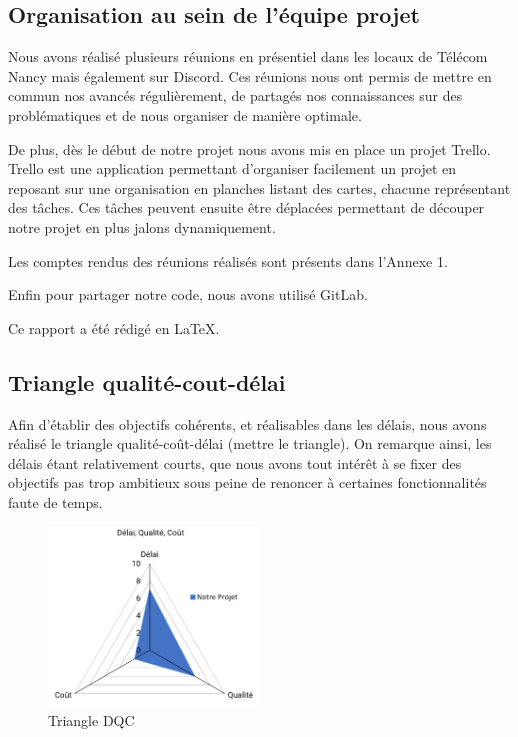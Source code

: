 \documentclass[french,a4paper]{article}
\begin{document}
\subsection{Organisation au sein de l’équipe projet}
Nous avons réalisé plusieurs réunions en présentiel dans les locaux de Télécom Nancy mais également sur Discord. Ces réunions nous ont permis de mettre en commun nos avancés régulièrement, de partagés nos connaissances sur des problématiques et de nous organiser de manière optimale.

De plus, dès le début de notre projet nous avons mis en place un projet Trello. Trello est une application permettant d’organiser facilement un projet en reposant sur une organisation en planches listant des cartes, chacune représentant des tâches. Ces tâches peuvent ensuite être déplacées permettant de découper notre projet en plus jalons dynamiquement.

Les comptes rendus des réunions réalisés sont présents dans l’Annexe 1.

Enfin pour partager notre code, nous avons utilisé GitLab.

Ce rapport a été rédigé en \LaTeX.

\subsection{Triangle qualité-cout-délai}
Afin d’établir des objectifs cohérents, et réalisables dans les délais, nous avons réalisé le triangle qualité-coût-délai (mettre le triangle). On remarque ainsi, les délais étant relativement courts, que nous avons tout intérêt à se fixer des objectifs pas trop ambitieux sous peine de renoncer à certaines fonctionnalités faute de temps. 

\begin{figure}[H]
    \centering
    \includegraphics[width=0.5\textwidth]{img/triangle_QCD.png}
    \caption{Triangle DQC}
\end{figure} 
\end{document}
